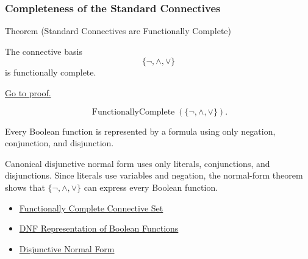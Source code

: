 \subsubsection*{Completeness of the Standard Connectives}

\begin{theorembox}{Theorem (Standard Connectives are Functionally Complete)}
\begin{theorem}
\label{thm:standard-connectives-functionally-complete-propositional-logic}
The connective basis
\[
\{\neg,\land,\lor\}
\]
is functionally complete.

\noindent\hyperref[prf:standard-connectives-functionally-complete-propositional-logic]{Go to proof.}
\end{theorem}
\end{theorembox}

\begin{remark*}
\[
\operatorname{FunctionallyComplete}(\{\neg,\land,\lor\}).
\]
\end{remark*}

\begin{remark*}
Every Boolean function is represented by a formula using only negation,
conjunction, and disjunction.
\end{remark*}

\begin{remark*}[Interpretation]
Canonical disjunctive normal form uses only literals, conjunctions, and
disjunctions. Since literals use variables and negation, the normal-form theorem
shows that \(\{\neg,\land,\lor\}\) can express every Boolean function.
\end{remark*}

\begin{dependencies}
\begin{itemize}
  \item \hyperref[def:functionally-complete-connective-set-propositional-logic]{Functionally Complete Connective Set}
  \item \hyperref[thm:dnf-representation-of-boolean-functions-propositional-logic]{DNF Representation of Boolean Functions}
  \item \hyperref[def:disjunctive-normal-form-propositional-logic]{Disjunctive Normal Form}
\end{itemize}
\end{dependencies}

